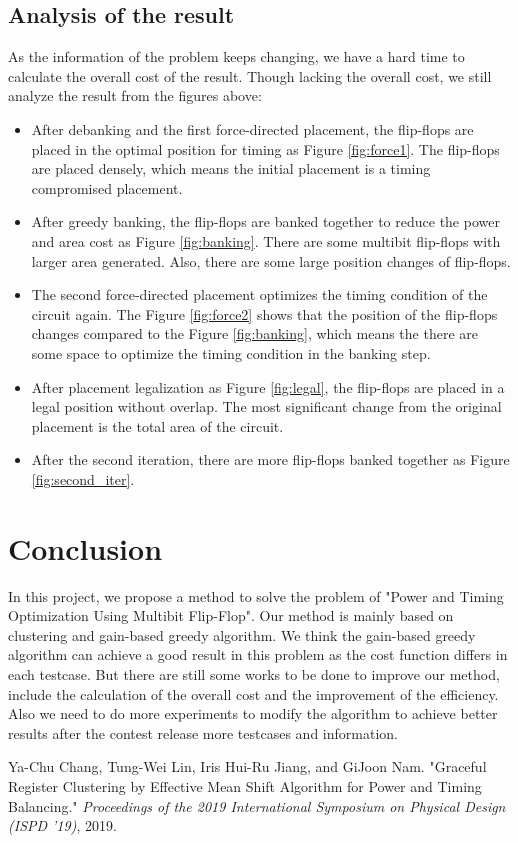 \documentclass[12pt]{article}
\begin{document}
\FloatBarrier

\subsection{Analysis of the result}

As the information of the problem keeps changing, we have a hard time to calculate the overall cost of the result. Though lacking the overall cost, we still analyze the result from the figures above:

\begin{itemize}
    \item After debanking and the first force-directed placement, the flip-flops are placed in the optimal position for timing as Figure \ref{fig:force1}. The flip-flops are placed densely, which means the initial placement is a timing compromised placement.
    \item After greedy banking, the flip-flops are banked together to reduce the power and area cost as Figure \ref{fig:banking}. There are some multibit flip-flops with larger area generated. Also, there are some large position changes of flip-flops.
    \item The second force-directed placement optimizes the timing condition of the circuit again. The Figure \ref{fig:force2} shows that the position of the flip-flops changes compared to the Figure \ref{fig:banking}, which means the there are some space to optimize the timing condition in the banking step.
    \item After placement legalization as Figure \ref{fig:legal}, the flip-flops are placed in a legal position without overlap. The most significant change from the original placement is the total area of the circuit.
    \item After the second iteration, there are more flip-flops banked together as Figure \ref{fig:second_iter}.
\end{itemize}

\section{Conclusion}

In this project, we propose a method to solve the problem of "Power and Timing Optimization Using Multibit Flip-Flop". Our method is mainly based on clustering and gain-based greedy algorithm. We think the gain-based greedy algorithm can achieve a good result in this problem as the cost function differs in each testcase. But there are still some works to be done to improve our method, include the calculation of the overall cost and the improvement of the efficiency. Also we need to do more experiments to modify the algorithm to achieve better results after the contest release more testcases and information.

\begin{thebibliography}{9}
    Ya-Chu Chang, Tung-Wei Lin, Iris Hui-Ru Jiang, and GiJoon Nam. "Graceful Register Clustering by Effective Mean Shift Algorithm for Power and Timing Balancing." \textit{Proceedings of the 2019 International Symposium on Physical Design (ISPD '19)}, 2019.
\end{thebibliography}
\end{document}
